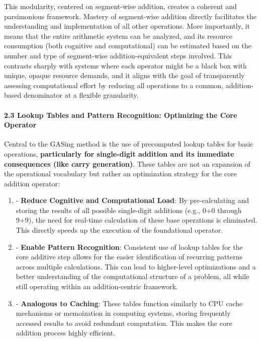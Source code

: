 This modularity, centered on segment-wise addition, creates a coherent and parsimonious framework. Mastery of segment-wise addition directly facilitates the understanding and implementation of all other operations. More importantly, it means that the entire arithmetic system can be analyzed, and its resource consumption (both cognitive and computational) can be estimated based on the number and type of segment-wise addition-equivalent steps involved. This contrasts sharply with systems where each operator might be a black box with unique, opaque resource demands, and it aligns with the goal of transparently assessing computational effort by reducing all operations to a common, addition-based denominator at a flexible granularity.

\paragraph{2.3 Lookup Tables and Pattern Recognition: Optimizing the Core Operator}
Central to the GASing method is the use of precomputed lookup tables for basic operations, \textbf{particularly for single-digit addition and its immediate consequences (like carry generation)}. These tables are not an expansion of the operational vocabulary but rather an optimization strategy for the core addition operator:

\begin{enumerate}
  \item - \textbf{Reduce Cognitive and Computational Load}: By pre-calculating and storing the results of all possible single-digit additions (e.g., 0+0 through 9+9), the need for real-time calculation of these base operations is eliminated. This directly speeds up the execution of the foundational operator.
  \item - \textbf{Enable Pattern Recognition}: Consistent use of lookup tables for the core additive step allows for the easier identification of recurring patterns across multiple calculations. This can lead to higher-level optimizations and a better understanding of the computational structure of a problem, all while still operating within an addition-centric framework.
  \item - \textbf{Analogous to Caching}: These tables function similarly to CPU cache mechanisms or memoization in computing systems, storing frequently accessed results to avoid redundant computation. This makes the core addition process highly efficient.
\end{enumerate}

